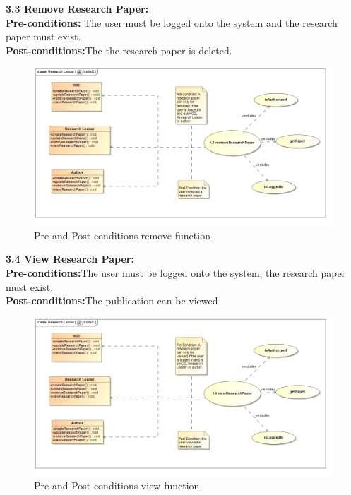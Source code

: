 \documentclass{article}
\begin{document}
				\indent \textbf{3.3 Remove Research Paper:}\\
					\indent \indent \textbf{Pre-conditions:} The user must be logged onto the system and the research paper must exist.\\
					\indent \indent \textbf{Post-conditions:}The the research paper is deleted.\\
					\begin{figure}
						\includegraphics[width=\textwidth]{removeResearch}
						\caption{Pre and Post conditions remove function}
					\end{figure}
				\indent \textbf{3.4 View Research Paper:}\\
					\indent \indent \textbf{Pre-conditions:}The user must be logged onto the system, the research paper must exist.\\
					\indent \indent \textbf{Post-conditions:}The publication can be viewed\\
					\begin{figure}
						\includegraphics[width=\textwidth]{viewPaper}
						\caption{Pre and Post conditions view function}
					\end{figure}
\end{document}

